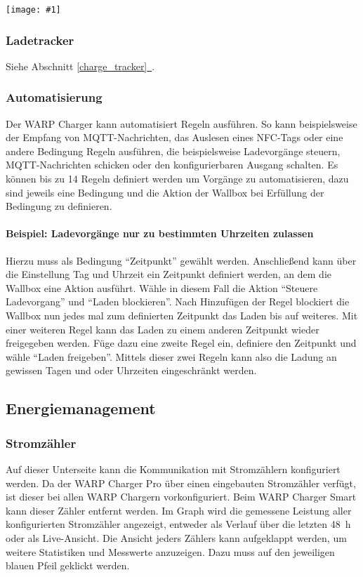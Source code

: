 \documentclass[a4paper,10pt]{article}
\newcommand{\gfx}[1]{\texttt{[image: \#1]}}
\newcommand*{\fullref}[1]{Abschnitt \hyperref[{#1}]{\ref*{#1}~\nameref*{#1}}}
\begin{document}
\begin{multicols*}{2}
    \gfx{./img_warp2/resized/web_evse2}

    \subsubsection{Ladetracker}
    Siehe \fullref{charge_tracker}.

    \subsubsection{Automatisierung}
    Der WARP Charger kann automatisiert Regeln ausführen. So kann beispielsweise
    der Empfang von MQTT-Nachrichten, das Auslesen eines NFC-Tags oder eine andere Bedingung
    Regeln ausführen, die beispielsweise Ladevorgänge steuern, MQTT-Nachrichten schicken oder
    den konfigurierbaren Ausgang schalten.
    Es können bis zu 14 Regeln definiert werden um Vorgänge zu automatisieren,
    dazu sind jeweils eine Bedingung und die Aktion der Wallbox bei Erfüllung der
    Bedingung zu definieren.

    \paragraph{Beispiel: Ladevorgänge nur zu bestimmten Uhrzeiten zulassen}
    Hierzu muss als Bedingung \enquote{Zeitpunkt} gewählt werden. Anschließend
    kann über die Einstellung Tag und Uhrzeit ein Zeitpunkt definiert werden, an
    dem die Wallbox eine Aktion ausführt. Wähle in diesem Fall die Aktion
    \enquote{Steuere Ladevorgang} und \enquote{Laden blockieren}. Nach
    Hinzufügen der Regel blockiert die Wallbox nun jedes mal zum definierten
    Zeitpunkt das Laden bis auf weiteres. Mit einer weiteren Regel kann
    das Laden zu einem anderen Zeitpunkt wieder freigegeben werden. Füge dazu
    eine zweite Regel ein, definiere den Zeitpunkt und wähle
    \enquote{Laden freigeben}. Mittels dieser zwei Regeln kann also die Ladung
    an gewissen Tagen und oder Uhrzeiten eingeschränkt werden.


	\subsection{Energiemanagement}\label{energiemanagement}



	\subsubsection{Stromzähler}\label{meter}
    Auf dieser Unterseite kann die Kommunikation mit Stromzählern konfiguriert werden.
    Da der WARP Charger Pro über einen eingebauten Stromzähler verfügt, ist dieser bei allen WARP Chargern vorkonfiguriert.
    Beim WARP Charger Smart kann dieser Zähler entfernt werden.
    Im Graph wird die gemessene Leistung aller konfigurierten Stromzähler
	angezeigt, entweder als Verlauf über die letzten \SI{48}{\hour} oder als
	Live-Ansicht. Die Ansicht jeders Zählers kann aufgeklappt werden, um weitere Statistiken und Messwerte anzuzeigen. Dazu muss auf den
	jeweiligen blauen Pfeil geklickt werden.


\end{multicols*}
\end{document}
